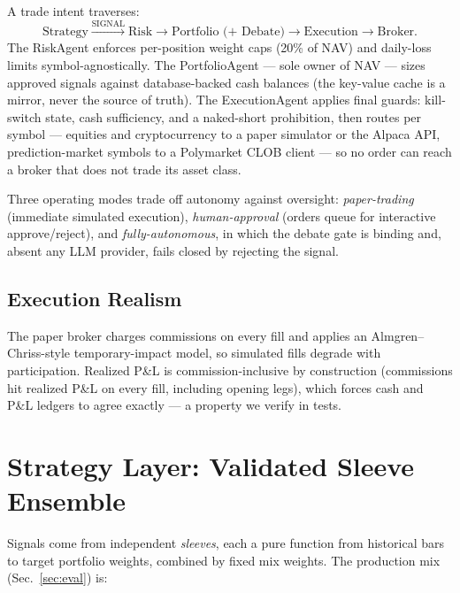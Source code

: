 \documentclass[10pt,twocolumn]{IEEEtran}
\begin{document}
A trade intent traverses:
\begin{equation*}
\text{Strategy} \xrightarrow{\text{SIGNAL}} \text{Risk}
\rightarrow \text{Portfolio (+ Debate)} \rightarrow \text{Execution}
\rightarrow \text{Broker}.
\end{equation*}
The RiskAgent enforces per-position weight caps (20\% of NAV) and daily-loss
limits symbol-agnostically. The PortfolioAgent — sole owner of NAV — sizes
approved signals against database-backed cash balances (the key-value cache
is a mirror, never the source of truth). The ExecutionAgent applies final
guards: kill-switch state, cash sufficiency, and a naked-short prohibition,
then routes per symbol --- equities and cryptocurrency to a paper simulator
or the Alpaca API, prediction-market symbols to a Polymarket CLOB client ---
so no order can reach a broker that does not trade its asset class.

Three operating modes trade off autonomy against oversight:
\emph{paper-trading} (immediate simulated execution),
\emph{human-approval} (orders queue for interactive approve/reject), and
\emph{fully-autonomous}, in which the debate gate is binding and, absent any
LLM provider, fails closed by rejecting the signal.

\subsection{Execution Realism}
The paper broker charges commissions on every fill and applies an
Almgren--Chriss-style \cite{almgren2001optimal} temporary-impact model, so
simulated fills degrade with participation. Realized P\&L is
commission-inclusive by construction (commissions hit realized P\&L on every
fill, including opening legs), which forces cash and P\&L ledgers to agree
exactly --- a property we verify in tests.

\section{Strategy Layer: Validated Sleeve Ensemble}
\label{sec:sleeves}

Signals come from independent \emph{sleeves}, each a pure function from
historical bars to target portfolio weights, combined by fixed mix weights.
The production mix (Sec.~\ref{sec:eval}) is:
\end{document}
